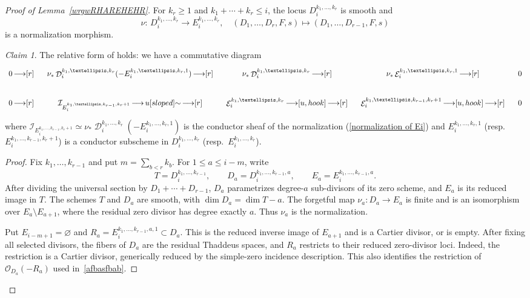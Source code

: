 \documentclass[11pt,letterpaper]{amsart}
\theoremstyle{plain}
\theoremstyle{definition}
\theoremstyle{remark}
\newtheorem{claim}[theorem]{Claim}
\numberwithin{equation}{section}
\DeclareMathOperator{\cD}{\mathcal{D}}
\DeclareMathOperator{\cE}{\mathcal{E}}
\def\arrow{\mathop{\longrightarrow}\limits}
\begin{document}
\begin{proof}[Proof of Lemma~\ref{wrgwRHAREHEHR}]
For $k_r\ge1$ and $k_1+\cdots+k_r\le i$, the locus $D_i^{k_1,\ldots,k_r}$ is smooth and 
\begin{equation}\label{normalization of Ei}
\nu:\, D_i^{k_1,\ldots,k_r}\to E_i^{k_1,\ldots,k_r},\quad (D_1,\ldots,D_r,F,s)\mapsto  (D_1,\ldots,D_{r-1},F,s)
\end{equation}
is a normalization morphism. 

\begin{claim}
The relative form of \cite[Lemma~6.5]{TT} holds: 
we have a commutative diagram
\begin{equation}\label{conductor}
    \begin{tikzcd}[column sep = 0.3cm]
    0 \arrow[r] & \nu_*\cD_i^{k_1,\ldots,k_r}(-E_i^{k_1,\ldots,k_r,1}) \arrow[r] &\nu_*\cD_i^{k_1,\ldots,k_r}\arrow[r] &\nu_*\cE_i^{k_1,\ldots,k_r,1} \arrow[r] &0\\
    0\arrow[r] &\mathcal{I}_{E_i^{k_1,\ldots,k_{r-1},k_r+1}}\arrow{u}[sloped]{\sim}\arrow[r] &\cE_i^{k_1,\ldots,k_r}\arrow[u,hook]\arrow[r] &\cE_i^{k_1,\ldots,k_{r-1},k_r+1}\arrow[u,hook]\arrow[r] &0
    \end{tikzcd}
\end{equation}
where $\mathcal{I}_{E_i^{k_1,\ldots,k_{r-1},k_r+1}}\simeq \nu_*\cD_i^{k_1,\ldots,k_r}(-E_i^{k_1,\ldots,k_r,1})$ is the conductor sheaf of the normalization (\ref{normalization of Ei}) and $E_i^{k_1,\ldots,k_r,1}$ (resp.~$E_i^{k_1,\ldots,k_{r-1},k_r+1}$)
is a conductor subscheme in $D_i^{k_1,\ldots,k_r}$ (resp.~$E_i^{k_1,\ldots,k_r}$).
\end{claim}

\begin{proof}
Fix $k_1,\ldots,k_{r-1}$ and put $m=\sum_{b<r}k_b$.
For $1\le a\le i-m$, write
\[
 T=D_i^{k_1,\ldots,k_{r-1}},\qquad
 D_a=D_i^{k_1,\ldots,k_{r-1},a},\qquad
 E_a=E_i^{k_1,\ldots,k_{r-1},a}.
\]
After dividing the universal section by $D_1+\cdots+D_{r-1}$,
$D_a$ parametrizes degree-$a$ sub-divisors of its zero scheme, and
$E_a$ is its reduced image in $T$. The schemes $T$ and $D_a$ are
smooth, with $\dim D_a=\dim T-a$. The forgetful map
$\nu_a:D_a\to E_a$ is finite and is an isomorphism over
$E_a\setminus E_{a+1}$, where the residual zero divisor has degree
exactly $a$. Thus $\nu_a$ is the normalization.

Put $E_{i-m+1}=\varnothing$ and
$R_a=E_i^{k_1,\ldots,k_{r-1},a,1}\subset D_a$.
This is the reduced inverse image of $E_{a+1}$ and is a Cartier
divisor, or is empty. After fixing all selected divisors, the fibers
of $D_a$ are the residual Thaddeus spaces, and $R_a$ restricts to
their reduced zero-divisor loci. Indeed, the restriction is a
Cartier divisor, generically reduced by the simple-zero incidence
description. This also identifies the restriction of
$\mathcal O_{D_a}(-R_a)$ used in~\eqref{afbasfbab}.


\end{proof}
\end{proof}
\end{document}
